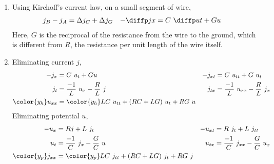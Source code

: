 \begin{enumerate}
\begin{enumerate}
              \item Using Kirchoff's current law, on a small segment of wire,
                    \begin{align}
                        j_B - j_A  & = \Delta j_C + \Delta j_G &
                        -\diffp jx & = C\ \diffp ut + Gu
                    \end{align}
                    Here, $ G $ is the reciprocal of the resistance from the wire to the
                    ground, which is different from $ R $, the resistance per unit length
                    of the wire itself.

              \item Eliminating current $ j $,
                    \begin{align}
                        -j_x              & = C\ u_t + Gu                        &
                        -j_{xt}           & = C\ u_{tt} + G\ u_t                   \\
                        j_{t}             & = \frac{-1}{L}\ u_x - \frac{R}{L}\ j &
                        j_{tx}            & = \frac{-1}{L}\ u_{xx} - \frac{R}{L}
                        \ j_x                                                      \\
                        \color{y_h}u_{xx} & = \color{y_h}LC\ u_{tt} + (RC + LG)
                        \ u_t + RG\ u
                    \end{align}
                    Eliminating potential $ u $,
                    \begin{align}
                        -u_x               & = Rj + L\ j_t                        &
                        -u_{xt}            & = R\ j_{t} + L\ j_{tt}                 \\
                        u_{t}              & = \frac{-1}{C}\ j_x - \frac{G}{C}\ u &
                        u_{tx}             & = \frac{-1}{C}\ j_{xx} - \frac{G}{C}
                        \ u_x                                                       \\
                        \color{y_p} j_{xx} & = \color{y_p} LC\ j_{tt} + (RC + LG)
                        \ j_t + RG\ j
                    \end{align}


\end{enumerate}
\end{enumerate}
